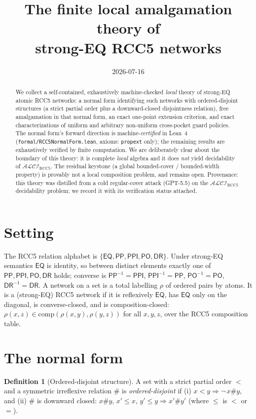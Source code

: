 \documentclass[11pt]{article}
\title{The finite local amalgamation theory of\\ strong-EQ RCC5 networks}
\author{}
\date{2026-07-16}
\newcommand{\DR}{\mathsf{DR}}
\newcommand{\PO}{\mathsf{PO}}
\newcommand{\PP}{\mathsf{PP}}
\newcommand{\PPI}{\mathsf{PPI}}
\newcommand{\EQ}{\mathsf{EQ}}
\newcommand{\Comp}{\mathrm{comp}}
\newcommand{\ALCIRCC}{\mathcal{ALCI}_{\mathrm{RCC5}}}
\newcommand{\code}[1]{\texttt{#1}}
\theoremstyle{plain}
\theoremstyle{definition}
\newtheorem{definition}[theorem]{Definition}
\begin{document}
\maketitle

\begin{abstract}
We collect a self-contained, exhaustively machine-checked \emph{local}
theory of strong-EQ atomic RCC5 networks: a normal form identifying such
networks with ordered-disjoint structures (a strict partial order plus a
downward-closed disjointness relation), free amalgamation in that normal
form, an exact one-point extension criterion, and exact characterizations
of uniform and arbitrary non-uniform cross-pocket guard policies. The
normal form's forward direction is machine-\emph{certified} in Lean~4
(\code{formal/RCC5NormalForm.lean}, axioms: \code{propext} only); the
remaining results are exhaustively verified by finite computation. We are
deliberately clear about the boundary of this theory: it is complete
\emph{local} algebra and it does \emph{not} yield decidability of
$\ALCIRCC$. The residual keystone (a global bounded-cover / bounded-width
property) is provably not a local composition problem, and remains open.
Provenance: this theory was distilled from a cold regular-cover attack
(GPT-5.5) on the $\ALCIRCC$ decidability problem; we record it with its
verification status attached.
\end{abstract}

\section{Setting}

The RCC5 relation alphabet is $\{\EQ,\PP,\PPI,\PO,\DR\}$. Under strong-EQ
semantics $\EQ$ is identity, so between distinct elements exactly one of
$\PP,\PPI,\PO,\DR$ holds; converse is
$\PP^{-1}=\PPI$, $\PPI^{-1}=\PP$, $\PO^{-1}=\PO$, $\DR^{-1}=\DR$. A
network on a set is a total labelling $\rho$ of ordered pairs by atoms.
It is a (strong-EQ) RCC5 network if it is reflexively $\EQ$, has $\EQ$
only on the diagonal, is converse-closed, and is composition-closed:
$\rho(x,z)\in\Comp(\rho(x,y),\rho(y,z))$ for all $x,y,z$, over the RCC5
composition table.

\section{The normal form}

\begin{definition}[Ordered-disjoint structure]
A set with a strict partial order $<$ and a symmetric irreflexive
relation $\#$ is \emph{ordered-disjoint} if (i) $x<y \Rightarrow \neg\,
x\#y$, and (ii) $\#$ is downward closed: $x\#y$, $x'\le x$, $y'\le y
\Rightarrow x'\#y'$ (where $\le$ is $<$ or $=$).
\end{definition}
\end{document}
